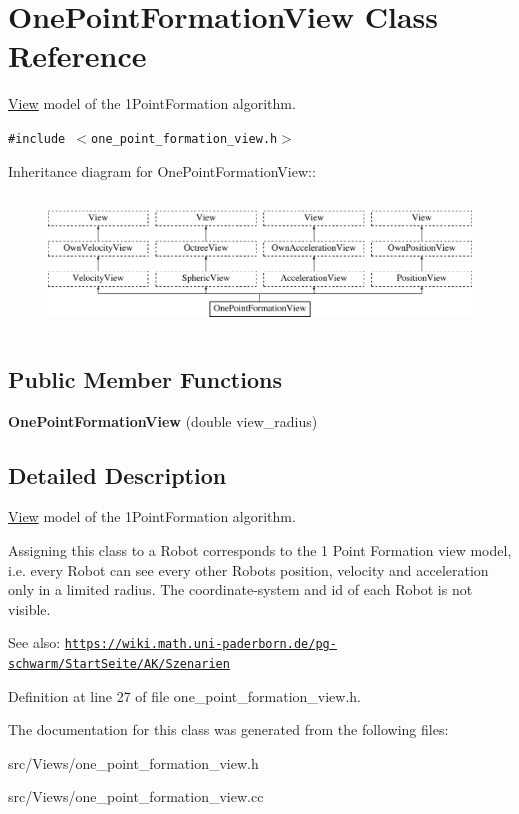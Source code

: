 \hypertarget{class_one_point_formation_view}{
\section{OnePointFormationView Class Reference}
\label{class_one_point_formation_view}
}
\hyperlink{class_view}{View} model of the 1PointFormation algorithm.  


{\tt \#include $<$one\_\-point\_\-formation\_\-view.h$>$}

Inheritance diagram for OnePointFormationView::\begin{figure}[H]
\begin{center}
\leavevmode
\includegraphics[height=3.58974cm]{class_one_point_formation_view}
\end{center}
\end{figure}
\subsection*{Public Member Functions}
\begin{CompactItemize}
\item 
\hypertarget{class_one_point_formation_view_4862bc6a8d1fc1e68e34e0be1f414e04}{
\textbf{OnePointFormationView} (double view\_\-radius)}
\label{class_one_point_formation_view_4862bc6a8d1fc1e68e34e0be1f414e04}

\end{CompactItemize}


\subsection{Detailed Description}
\hyperlink{class_view}{View} model of the 1PointFormation algorithm. 

Assigning this class to a Robot corresponds to the 1 Point Formation view model, i.e. every Robot can see every other Robots position, velocity and acceleration only in a limited radius. The coordinate-system and id of each Robot is not visible.

\begin{Desc}
\item[See also:]\href{https://wiki.math.uni-paderborn.de/pg-schwarm/StartSeite/AK/Szenarien}{\tt https://wiki.math.uni-paderborn.de/pg-schwarm/StartSeite/AK/Szenarien} \end{Desc}


Definition at line 27 of file one\_\-point\_\-formation\_\-view.h.

The documentation for this class was generated from the following files:\begin{CompactItemize}
\item 
src/Views/one\_\-point\_\-formation\_\-view.h\item 
src/Views/one\_\-point\_\-formation\_\-view.cc\end{CompactItemize}
